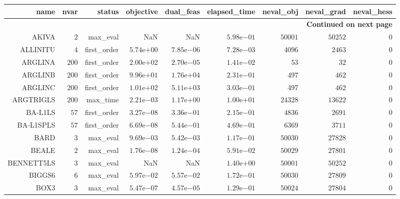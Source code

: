 \begin{longtable}{rrrrrrrrr}
\hline
name & nvar & status & objective & dual\_feas & elapsed\_time & neval\_obj & neval\_grad & neval\_hess \\\hline
\endhead
\hline
\multicolumn{9}{r}{{\bfseries Continued on next page}}\\
\hline
\endfoot
\endlastfoot
AKIVA & \(     2\) & max\_eval &       NaN &       NaN & \( 5.98\)e\(-01\) & \( 50001\) & \( 50252\) & \(     0\) \\
ALLINITU & \(     4\) & first\_order & \( 5.74\)e\(+00\) & \( 7.85\)e\(-06\) & \( 7.28\)e\(-03\) & \(  4096\) & \(  2463\) & \(     0\) \\
ARGLINA & \(   200\) & first\_order & \( 2.00\)e\(+02\) & \( 2.70\)e\(-05\) & \( 1.41\)e\(-02\) & \(    53\) & \(    32\) & \(     0\) \\
ARGLINB & \(   200\) & first\_order & \( 9.96\)e\(+01\) & \( 1.76\)e\(+04\) & \( 2.31\)e\(-01\) & \(   497\) & \(   462\) & \(     0\) \\
ARGLINC & \(   200\) & first\_order & \( 1.01\)e\(+02\) & \( 5.11\)e\(+03\) & \( 3.03\)e\(-01\) & \(   497\) & \(   462\) & \(     0\) \\
ARGTRIGLS & \(   200\) & max\_time & \( 2.21\)e\(-03\) & \( 1.17\)e\(+00\) & \( 1.00\)e\(+01\) & \( 24328\) & \( 13622\) & \(     0\) \\
BA-L1LS & \(    57\) & first\_order & \( 3.27\)e\(-08\) & \( 3.36\)e\(-01\) & \( 2.15\)e\(-01\) & \(  4836\) & \(  2691\) & \(     0\) \\
BA-L1SPLS & \(    57\) & first\_order & \( 6.69\)e\(-08\) & \( 5.44\)e\(-01\) & \( 4.69\)e\(-01\) & \(  6369\) & \(  3711\) & \(     0\) \\
BARD & \(     3\) & max\_eval & \( 9.69\)e\(-03\) & \( 5.42\)e\(-03\) & \( 1.17\)e\(-01\) & \( 50030\) & \( 27828\) & \(     0\) \\
BEALE & \(     2\) & max\_eval & \( 1.76\)e\(-08\) & \( 1.24\)e\(-04\) & \( 5.91\)e\(-02\) & \( 50029\) & \( 27801\) & \(     0\) \\
BENNETT5LS & \(     3\) & max\_eval &       NaN &       NaN & \( 1.40\)e\(+00\) & \( 50001\) & \( 50252\) & \(     0\) \\
BIGGS6 & \(     6\) & max\_eval & \( 5.97\)e\(-02\) & \( 5.57\)e\(-02\) & \( 1.72\)e\(-01\) & \( 50030\) & \( 27809\) & \(     0\) \\
BOX3 & \(     3\) & max\_eval & \( 5.47\)e\(-07\) & \( 4.57\)e\(-05\) & \( 1.29\)e\(-01\) & \( 50024\) & \( 27804\) & \(     0\) \\

\end{longtable}
